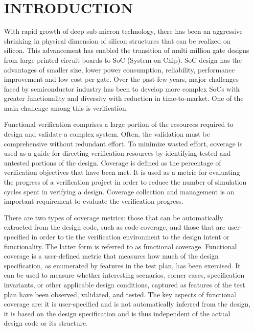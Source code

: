 \chapter{INTRODUCTION}

With rapid growth of deep sub-micron technology, there has been an aggressive shrinking in physical dimension of silicon structures that can be realized on silicon. This advancement has enabled the transition of multi million gate designs from large printed circuit boards to SoC (System on Chip). SoC design has the advantages of smaller size, lower power consumption, reliability, performance improvement and low cost per gate. Over the past few years, major challenges faced by semiconductor industry has been to develop more complex SoCs with greater functionality and diversity with reduction in time-to-market. One of the main challenge among this is verification.

Functional verification comprises a large portion of the resources required to design and validate a complex system. Often, the validation must be comprehensive without redundant effort. To minimize wasted effort, coverage is used as a guide for directing verification resources by identifying tested and untested portions of the design. Coverage is defined as the percentage of verification objectives that have been met. It is used as a metric for evaluating the progress of a verification project in order to reduce the number of simulation cycles spent in verifying a design. Coverage collection and management is an important requirement to evaluate the verification progress.

There are two types of coverage metrics: those that can be automatically extracted from the design code, such as code coverage, and those that are user-specified in order to tie the verification environment to the design intent or functionality. The latter form is referred to as functional coverage. Functional coverage is a user-defined metric that measures how much of the design specification, as enumerated by features in the test plan, has been exercised. It can be used to measure whether interesting scenarios, corner cases, specification invariants, or other applicable design conditions, captured as features of the test plan have been observed, validated, and tested. The key aspects of functional coverage are: it is user-specified and is not automatically inferred from the design, it is based on the design specification and is thus independent of the actual design code or its structure.




